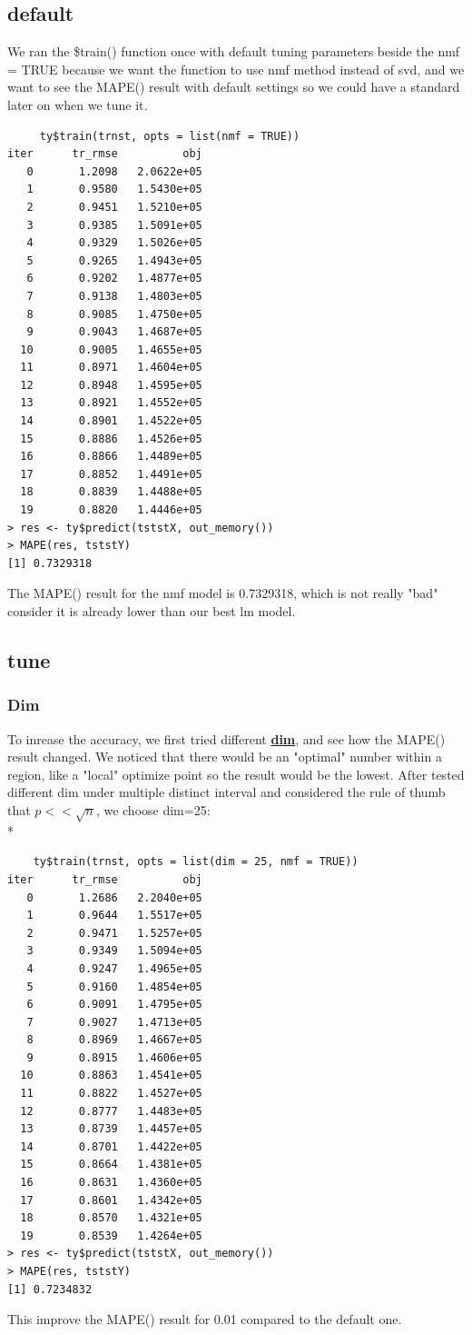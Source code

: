 \documentclass[11pt]{article}
\newcommand\tab[1][0.5cm]{\hspace*{#1}}
\begin{document}
\subsection{default}
\tab{}We ran the \$train() function once with default tuning parameters beside the nmf = TRUE because we want the function to use nmf method instead of svd, and we want to see the MAPE() result with default settings so we could have a standard later on when we tune it.
\begin{verbatim}
     ty$train(trnst, opts = list(nmf = TRUE))
iter      tr_rmse          obj
   0       1.2098   2.0622e+05
   1       0.9580   1.5430e+05
   2       0.9451   1.5210e+05
   3       0.9385   1.5091e+05
   4       0.9329   1.5026e+05
   5       0.9265   1.4943e+05
   6       0.9202   1.4877e+05
   7       0.9138   1.4803e+05
   8       0.9085   1.4750e+05
   9       0.9043   1.4687e+05
  10       0.9005   1.4655e+05
  11       0.8971   1.4604e+05
  12       0.8948   1.4595e+05
  13       0.8921   1.4552e+05
  14       0.8901   1.4522e+05
  15       0.8886   1.4526e+05
  16       0.8866   1.4489e+05
  17       0.8852   1.4491e+05
  18       0.8839   1.4488e+05
  19       0.8820   1.4446e+05
> res <- ty$predict(tststX, out_memory())
> MAPE(res, tststY)
[1] 0.7329318
\end{verbatim}

\tab{}The MAPE() result for the nmf model is 0.7329318, which is not really "bad" consider it is already lower than our best lm model.

\subsection{tune}
\subsubsection{Dim}
\tab{}To inrease the accuracy, we first tried different \textbf{\underline{dim}}, and see how the MAPE() result changed. We noticed that there would be an "optimal" number within a region, like a "local" optimize point so the result would be the lowest. After tested different dim under multiple distinct interval and considered the rule of thumb that $p << \sqrt{n}$, we choose dim=25:
\\*
\begin{verbatim}
    ty$train(trnst, opts = list(dim = 25, nmf = TRUE))
iter      tr_rmse          obj
   0       1.2686   2.2040e+05
   1       0.9644   1.5517e+05
   2       0.9471   1.5257e+05
   3       0.9349   1.5094e+05
   4       0.9247   1.4965e+05
   5       0.9160   1.4854e+05
   6       0.9091   1.4795e+05
   7       0.9027   1.4713e+05
   8       0.8969   1.4667e+05
   9       0.8915   1.4606e+05
  10       0.8863   1.4541e+05
  11       0.8822   1.4527e+05
  12       0.8777   1.4483e+05
  13       0.8739   1.4457e+05
  14       0.8701   1.4422e+05
  15       0.8664   1.4381e+05
  16       0.8631   1.4360e+05
  17       0.8601   1.4342e+05
  18       0.8570   1.4321e+05
  19       0.8539   1.4264e+05
> res <- ty$predict(tststX, out_memory())
> MAPE(res, tststY)
[1] 0.7234832
\end{verbatim}
This improve the MAPE() result for 0.01 compared to the default one.
\end{document}
